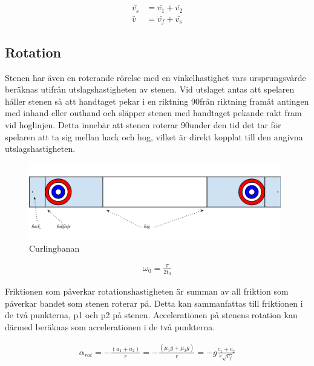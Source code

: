 \documentclass[11pt]{article} %
\begin{document}
 \begin{subequations}\label{vtot}
 \begin{align}
 \bar{v_s}& = \bar{v_1}+\bar{v_2}\\
 \bar{v}&=\bar{v_f}+\bar{v_s}
 \end{align}
 \end{subequations}

\subsection{Rotation}


Stenen har även en roterande rörelse med en vinkelhastighet vars ursprungsvärde beräknas utifrån utslagshastigheten av stenen.
Vid utslaget antas att spelaren håller stenen så att handtaget pekar i en riktning 90\textdegree  från riktning framåt antingen med inhand eller outhand och släpper stenen med handtaget pekande rakt fram vid hoglinjen. Detta innebär att stenen roterar 90\textdegree under den tid det tar för spelaren att ta sig mellan hack och hog, vilket är direkt kopplat till den angivna utslagshastigheten. 

\begin{figure}[ht!]
\centering
\includegraphics[width=110mm]{bana.png}
\caption{Curlingbanan}
\label{fig:bana}
\label{overflow}
\end{figure}


\begin{align}%
 \omega_0 = \frac{\pi}{2 t_0} 
 \end{align}


Friktionen som påverkar rotationshastigheten är summan av all friktion som påverkar bandet som stenen roterar på. Detta kan sammanfattas till friktionen i de två punkterna, p1 och p2 på stenen. Accelerationen på stenens rotation kan därmed beräknas som accelerationen i de två punkterna. 

 \begin{align}\label{a_rotation1}
 \alpha_{rot} =- \frac{( a_1 + a_2)}{r} = -\frac{(\mu_1 g + \mu_2 g)}{r} = - g\frac{c_1+c_2}{r \sqrt{v_f}}
 \end{align}
 
\end{document}
